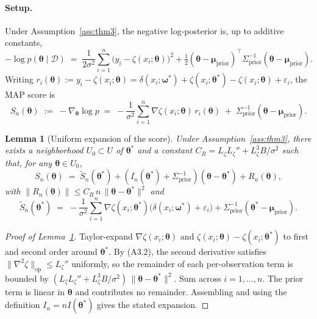 \documentclass[12pt]{article}
\theoremstyle{plain}
\newtheorem{lemma}[theorem]{Lemma}
\theoremstyle{definition}
\theoremstyle{remark}
\newcommand{\norm}[1]{\lVert #1 \rVert}
\begin{document}
\paragraph{Setup.}  Under Assumption~\ref{ass:thm3}, the negative
log-posterior is, up to additive constants,
\begin{equation}\label{eq:negloglik_decomp}
   -\log p(\boldsymbol\theta\mid\mathcal{D})
   \;=\; \frac{1}{2\sigma^2}\sum_{i=1}^n
       \bigl(y_i - \zeta(x_i;\boldsymbol\theta)\bigr)^2
       + \tfrac{1}{2}
         (\boldsymbol\theta-\boldsymbol\mu_{\mathrm{prior}})^\top
         \Sigma_{\mathrm{prior}}^{-1}
         (\boldsymbol\theta-\boldsymbol\mu_{\mathrm{prior}}).
\end{equation}
Writing $r_i(\boldsymbol\theta):=y_i-\zeta(x_i;\boldsymbol\theta)
=\delta(x_i;\boldsymbol\omega^*)+\zeta(x_i;\boldsymbol\theta^*)
-\zeta(x_i;\boldsymbol\theta)+\varepsilon_i$, the MAP score is
\begin{equation}\label{eq:MAP_score}
  S_n(\boldsymbol\theta) \;:=\; -\nabla_{\boldsymbol\theta}\log p
   \;=\; -\frac{1}{\sigma^2}\sum_{i=1}^n
        \nabla\zeta(x_i;\boldsymbol\theta)\,r_i(\boldsymbol\theta)
   \;+\; \Sigma_{\mathrm{prior}}^{-1}
         (\boldsymbol\theta-\boldsymbol\mu_{\mathrm{prior}}).
\end{equation}

\begin{lemma}[Uniform expansion of the score]\label{lem:bias_expansion}
Under Assumption~\ref{ass:thm3}, there exists a neighborhood
$U_0\subset U$ of $\boldsymbol\theta^*$ and a constant
$C_R=L_\zeta L_\zeta''+L_\zeta^3 B/\sigma^2$ such that, for any
$\boldsymbol\theta\in U_0$,
\[
  S_n(\boldsymbol\theta) \;=\; \tilde S_n(\boldsymbol\theta^*)
   + (I_n(\boldsymbol\theta^*)+\Sigma_{\mathrm{prior}}^{-1})
      (\boldsymbol\theta-\boldsymbol\theta^*)
   + R_n(\boldsymbol\theta),
\]
with $\norm{R_n(\boldsymbol\theta)}\le C_R\,n\,\norm{\boldsymbol\theta-
\boldsymbol\theta^*}^2$ and
\[
  \tilde S_n(\boldsymbol\theta^*)
     \;=\; -\frac{1}{\sigma^2}\sum_{i=1}^n
         \nabla\zeta(x_i;\boldsymbol\theta^*)
         \bigl(\delta(x_i;\boldsymbol\omega^*)+\varepsilon_i\bigr)
     + \Sigma_{\mathrm{prior}}^{-1}
       (\boldsymbol\theta^*-\boldsymbol\mu_{\mathrm{prior}}).
\]
\end{lemma}

\begin{proof}[Proof of Lemma~\ref{lem:bias_expansion}]
Taylor-expand $\nabla\zeta(x_i;\boldsymbol\theta)$ and $\zeta(x_i;
\boldsymbol\theta)-\zeta(x_i;\boldsymbol\theta^*)$ to first and second
order around $\boldsymbol\theta^*$.  By (A3.2), the second derivative
satisfies $\norm{\nabla^2\zeta}_{\mathrm{op}}\le L_\zeta''$ uniformly,
so the remainder of each per-observation term is bounded by
$(L_\zeta L_\zeta''+L_\zeta^3 B/\sigma^2)\,\norm{\boldsymbol\theta-
\boldsymbol\theta^*}^2$.  Sum across $i=1,\ldots,n$.  The prior term is
linear in $\boldsymbol\theta$ and contributes no remainder.
Assembling and using the definition $I_n=n I(\boldsymbol\theta^*)$
gives the stated expansion.
\end{proof}
\end{document}
